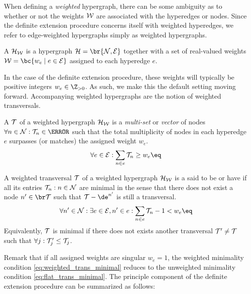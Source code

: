 \documentclass[aps, 10pt, english, twoside, pra, nofootinbib, longbibliography]{revtex4-1}
\begin{document}
    When defining a \textit{weighted} hypergraph, there can be some ambiguity as to whether or not the weights $\mathcal{W}$ are associated with the hyperedges or nodes. Since the definite extension procedure concerns itself with weighted hyperedges, we refer to edge-weighted hypergraphs simply as weighted hypergraphs.
    \begin{definition}
        A  $\mathcal{H}_{\mathcal{W}}$ is a hypergraph $\hgraph = \br{\nodes, \edges}$ together with a set of real-valued weights $\weights = \bc{w_e \mid e \in \edges}$ assigned to each hyperedge $e$.
    \end{definition}
    In the case of the definite extension procedure, these weights will typically be positive integers $w_e \in \Z_{> 0}$. As such, we make this the default setting moving forward. Accompanying weighted hypergraphs are the notion of weighted transversals.
    \begin{definition}
        A  $\mathcal{T}$ of a weighted hypergraph $\mathcal{H}_{\mathcal{W}}$ is a \textit{multi-set} or \textit{vector} of nodes $\forall n \in \nodes : \trans_n \in \N$ such that the total multiplicity of nodes in each hyperedge $e$ surpasses (or matches) the assigned weight $w_e$.
        \[ \forall e \in \edges : \sum_{n \in e} \trans_{n} \geq w_e \eq \label{eq:weighted_trans_def}\]
    \end{definition}
    \begin{definition}
        A weighted transversal $\mathcal{T}$ of a weighted hypergraph $\mathcal{H}_{\mathcal{W}}$ is a said to be  or have  if all its entries $\mathcal{T}_n : n \in \mathcal{N}$ are minimal in the sense that there does not exist a node $n' \in \supp{\trans}$ such that $\trans - \de^{n'}$ is still a transversal.
        \[ \forall n' \in \nodes : \exists e \in \edges, n' \in e : \sum_{n \in e} \trans_{n} - 1 < w_e  \eq \label{eq:weighted_trans_minimal}\]
        Equivalently, $\mathcal{T}$ is minimal if there does not exists another transversal $\mathcal{T}' \neq \mathcal{T}$ such that $\forall j : \mathcal{T}'_j \leq \mathcal{T}_j$.
    \end{definition}
    Remark that if all assigned weights are singular $w_e = 1$, the weighted minimality condition \cref{eq:weighted_trans_minimal} reduces to the unweighted minimality condition \cref{eq:flat_trans_minimal}. The principle component of the definite extension procedure can be summarized as follows:
\end{document}

